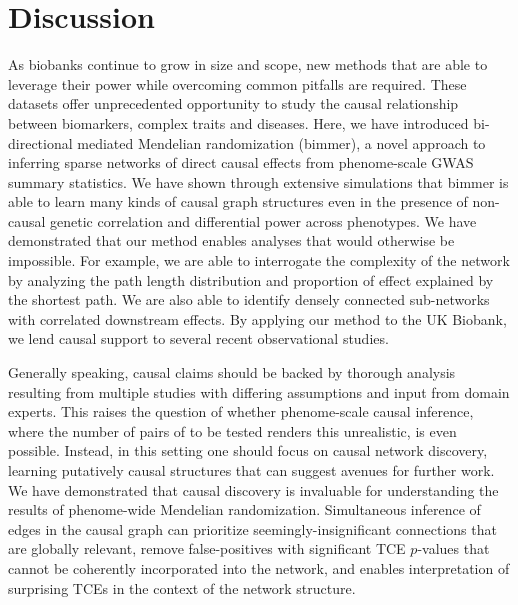 \documentclass{article}
\begin{document}
\section{Discussion}\label{discussion}
As biobanks continue to grow in size and scope, new methods that are able to
leverage their power while overcoming common pitfalls are required.
These datasets offer unprecedented opportunity to study
the causal relationship between biomarkers, complex traits and diseases.
Here, we have introduced bi-directional mediated Mendelian randomization (bimmer),
a novel approach to inferring sparse networks of direct causal effects from phenome-scale
GWAS summary statistics. We have shown through extensive simulations that
bimmer is able to learn many kinds of causal graph structures even in the presence
of non-causal genetic correlation and differential power across phenotypes.
We have demonstrated that our method enables analyses that would otherwise be impossible. For example, 
we are able to interrogate the complexity of the network by analyzing the path length
distribution and proportion of effect explained by the shortest path. We are also able to 
identify densely connected sub-networks with correlated downstream effects. By applying our
method to the UK Biobank, we lend causal support to several recent observational studies.

Generally speaking, causal claims should be backed by thorough analysis resulting from
multiple studies with differing assumptions and input from domain experts. This raises the question
of whether phenome-scale causal inference, where the number of pairs of to be tested
renders this unrealistic, is even possible. Instead, in this setting one should focus on
causal network discovery, learning putatively causal structures that can suggest avenues for further
work. We have demonstrated that causal discovery is invaluable for understanding
the results of phenome-wide Mendelian randomization. Simultaneous inference of edges in
the causal graph can prioritize seemingly-insignificant connections that are globally relevant,
remove false-positives with significant TCE $p$-values that
cannot be coherently incorporated into the network, and enables interpretation of
 surprising TCEs in the context of the network structure.
\end{document}
